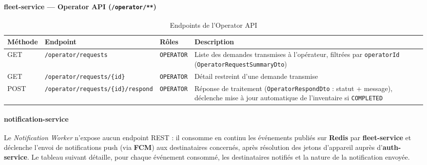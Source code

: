 \documentclass[11pt,a4paper]{article}
\begin{document}
\paragraph{fleet-service — Operator API (\texttt{/operator/**})}
\begin{table}[H]
\centering
\small
\begin{tabular}{|p{1.4cm}|p{3.6cm}|p{2cm}|p{6.2cm}|}
\hline
\textbf{Méthode} & \textbf{Endpoint} & \textbf{Rôles} & \textbf{Description} \\
\hline
GET & \texttt{/operator/requests} & \texttt{OPERATOR} & Liste des demandes transmises à l'opérateur, filtrées par \texttt{operatorId} (\texttt{OperatorRequestSummaryDto}) \\
\hline
GET & \texttt{/operator/requests/\{id\}} & \texttt{OPERATOR} & Détail restreint d'une demande transmise \\
\hline
POST & \texttt{/operator/requests/\{id\}/respond} & \texttt{OPERATOR} & Réponse de traitement (\texttt{OperatorRespondDto} : statut + message), déclenche mise à jour automatique de l'inventaire si \texttt{COMPLETED} \\
\hline
\end{tabular}
\caption{Endpoints de l'Operator API}
\end{table}

\paragraph{notification-service}

Le \textit{Notification Worker} n'expose aucun endpoint REST : il consomme en continu les
événements publiés sur \textbf{Redis} par \textbf{fleet-service} et déclenche l'envoi de
notifications push (via \textbf{FCM}) aux destinataires concernés, après résolution des
jetons d'appareil auprès d'\textbf{auth-service}. Le tableau suivant détaille, pour chaque
événement consommé, les destinataires notifiés et la nature de la notification envoyée.
\end{document}
